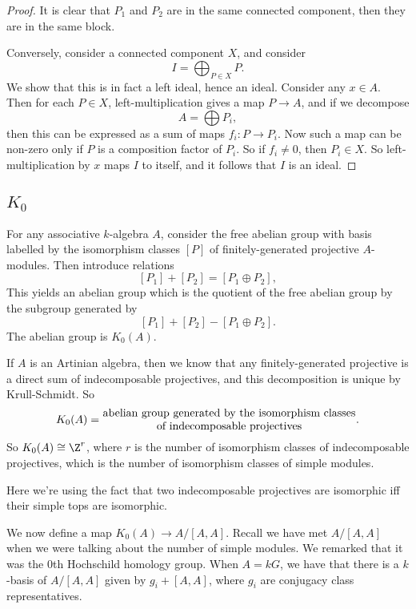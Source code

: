 \documentclass[a4paper]{article}
\begin{document}
\begin{proof}
  It is clear that $P_1$ and $P_2$ are in the same connected component, then they are in the same block.

  Conversely, consider a connected component $X$, and consider
  \[
    I = \bigoplus_{P \in X} P.
  \]
  We show that this is in fact a left ideal, hence an ideal. Consider any $x \in A$. Then for each $P \in X$, left-multiplication gives a map $P \to A$, and if we decompose
  \[
    A = \bigoplus P_i,
  \]
  then this can be expressed as a sum of maps $f_i: P \to P_i$. Now such a map can be non-zero only if $P$ is a composition factor of $P_i$. So if $f_i \not= 0$, then $P_i \in X$. So left-multiplication by $x$ maps $I$ to itself, and it follows that $I$ is an ideal.
\end{proof}

\subsection{\texorpdfstring{$K_0$}{K_0}}

\begin{defi}[$K_0$]
  For any associative $k$-algebra $A$, consider the free abelian group with basis labelled by the isomorphism classes $[P]$ of finitely-generated projective $A$-modules. Then introduce relations
  \[
    [P_1] + [P_2] = [P_1 \oplus P_2],
  \]
  This yields an abelian group which is the quotient of the free abelian group by the subgroup generated by
  \[
    [P_1] + [P_2] - [P_1 \oplus P_2].
  \]
  The abelian group is $K_0(A)$.
\end{defi}

\begin{eg}
  If $A$ is an Artinian algebra, then we know that any finitely-generated projective is a direct sum of indecomposable projectives, and this decomposition is unique by Krull-Schmidt. So
  \[
    K_0(A) = \parbox{8cm}{\centering abelian group generated by the isomorphism classes of indecomposable projectives}.
  \]
  So $K_0(A) \cong \Z^r$, where $r$ is the number of isomorphism classes of indecomposable projectives, which is the number of isomorphism classes of simple modules.

  Here we're using the fact that two indecomposable projectives are isomorphic iff their simple tops are isomorphic.
\end{eg}

We now define a map $K_0(A) \to A/[A, A]$. Recall we have met $A/[A, A]$ when we were talking about the number of simple modules. We remarked that it was the $0$th Hochschild homology group. When $A = kG$, we have that there is a $k$-basis of $A/[A, A]$ given by $g_i + [A, A]$, where $g_i$ are conjugacy class representatives.
\end{document}
